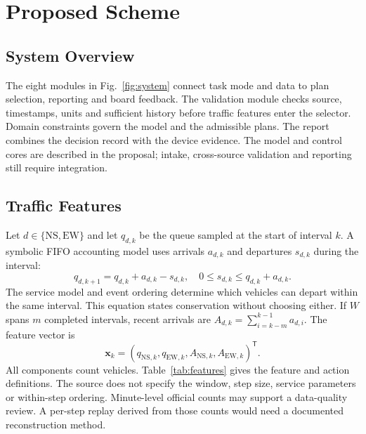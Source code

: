 \section{Proposed Scheme}
\subsection{System Overview}
The eight modules in Fig.~\ref{fig:system} connect task mode and data to plan selection, reporting and board feedback. The validation module checks source, timestamps, units and sufficient history before traffic features enter the selector. Domain constraints govern the model and the admissible plans. The report combines the decision record with the device evidence. The model and control cores are described in the proposal; intake, cross-source validation and reporting still require integration.



\subsection{Traffic Features}
Let $d\in\{\mathrm{NS},\mathrm{EW}\}$ and let $q_{d,k}$ be the queue sampled at the start of interval $k$. A symbolic FIFO accounting model uses arrivals $a_{d,k}$ and departures $s_{d,k}$ during the interval:
\begin{equation}
q_{d,k+1}=q_{d,k}+a_{d,k}-s_{d,k},\quad
0\le s_{d,k}\le q_{d,k}+a_{d,k}.
\label{eq:conservation}
\end{equation}
The service model and event ordering determine which vehicles can depart within the same interval. This equation states conservation without choosing either. If $W$ spans $m$ completed intervals, recent arrivals are $A_{d,k}=\sum_{i=k-m}^{k-1}a_{d,i}$. The feature vector is
\begin{equation}
\mathbf{x}_k=(q_{\mathrm{NS},k},q_{\mathrm{EW},k},
A_{\mathrm{NS},k},A_{\mathrm{EW},k})^\mathsf{T}.
\label{eq:features}
\end{equation}
All components count vehicles. Table~\ref{tab:features} gives the feature and action definitions. The source does not specify the window, step size, service parameters or within-step ordering. Minute-level official counts may support a data-quality review. A per-step replay derived from those counts would need a documented reconstruction method.

